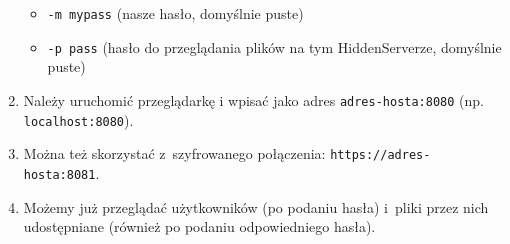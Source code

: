 \documentclass[a4paper,notitlepage]{article}
\begin{document}
\begin{enumerate}
\begin{itemize}
    \item \texttt{-m mypass} (nasze hasło, domyślnie puste)
    \item \texttt{-p pass} (hasło do przeglądania plików na tym HiddenServerze,
 domyślnie puste)
    \end{itemize}
\item Należy uruchomić przeglądarkę i wpisać jako adres 
\texttt{adres-hosta:8080} (np. \texttt{localhost:8080}).
\item Można też skorzystać z~szyfrowanego połączenia: 
\texttt{https://adres-hosta:8081}.
\item Możemy już przeglądać użytkowników (po podaniu hasła) 
i~pliki przez nich udostępniane (również po podaniu odpowiedniego hasła).
\end{enumerate}
\end{document}
